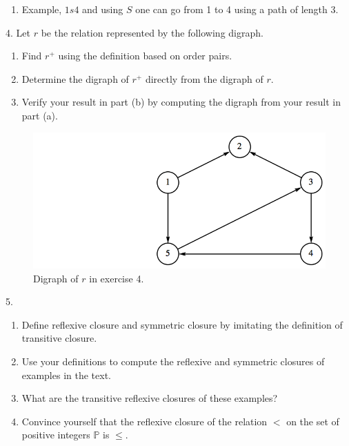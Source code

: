 \documentclass[10pt,]{book}
\theoremstyle{plain}
\theoremstyle{definition}
\theoremstyle{definition}
\theoremstyle{definition}
\theoremstyle{definition}
\begin{document}
\begin{exercisegroup}
\begin{enumerate}[label=\alph*]
\begin{figure}
\end{figure}
%
\item\hypertarget{li-123}{}  Example, \(1s 4\) and using \(S\) one can go from 1 to 4 using a path of length 3.%
\end{enumerate}
%
\item[4.]\hypertarget{exercise-37}{} Let \(r\) be the relation represented by the following digraph.%
\par
\leavevmode%
\begin{enumerate}[label=\alph*]
\item\hypertarget{li-124}{} Find \(r^+\) using the definition based on order pairs.%
\item\hypertarget{li-125}{} Determine the digraph of \(r^+\) directly from the digraph of \(r\).%
\item\hypertarget{li-126}{} Verify your result in part (b) by computing the digraph from your result in part (a).%
\end{enumerate}
%
\leavevmode%
\begin{figure}
\centering
\includegraphics[width=1\linewidth]{images/fig-exercise-6-5-4.png}
\caption{Digraph of \(r\) in exercise 4. 
			 \label{figure-18}}
\end{figure}
\par\smallskip
\item[5.]\hypertarget{exercise-38}{}\leavevmode%
\begin{enumerate}[label=\alph*]
\item\hypertarget{li-127}{}Define reflexive closure and symmetric closure by imitating the definition of transitive closure.%
\item\hypertarget{li-128}{} Use your definitions to compute the reflexive and symmetric closures of examples in the text.%
\item\hypertarget{li-129}{} What are the transitive reflexive closures of these examples?%
\item\hypertarget{li-130}{} Convince yourself that the reflexive closure of the relation \(<\) on the set of positive integers \(\mathbb{P}\) is \(\leq\).%

\end{enumerate}
\end{exercisegroup}
\end{document}
